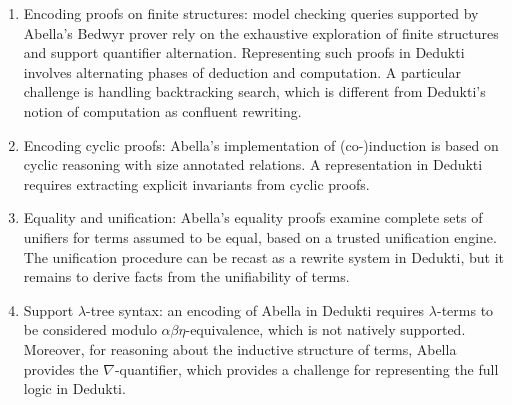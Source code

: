 \begin{enumerate}
\item Encoding proofs on finite structures: model checking queries supported by
  Abella's Bedwyr prover rely on the exhaustive exploration of finite structures
  and support quantifier alternation. Representing such proofs in Dedukti
  involves alternating phases of deduction and computation. A particular
  challenge is handling backtracking search, which is different from Dedukti's
  notion of computation as confluent rewriting.
\item Encoding cyclic proofs: Abella's implementation of (co-)induction is based
  on cyclic reasoning with size annotated relations. A representation in Dedukti
  requires extracting explicit invariants from cyclic proofs.
\item Equality and unification: Abella's equality proofs examine complete sets
  of unifiers for terms assumed to be equal, based on a trusted unification
  engine. The unification procedure can be recast as a rewrite system in
  Dedukti, but it remains to derive facts from the unifiability of terms.
\item Support $\lambda$-tree syntax: an encoding of Abella in Dedukti requires
  $\lambda$-terms to be considered modulo $\alpha\beta\eta$-equivalence, which
  is not natively supported. Moreover, for reasoning about the inductive
  structure of terms, Abella provides the $\nabla$-quantifier, which provides a
  challenge for representing the full logic in Dedukti.  
\end{enumerate}





